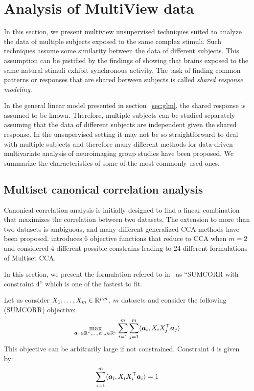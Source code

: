 \section{Analysis of MultiView data}
In this section, we present multiview unsupervised techniques suited to
analyze the data of multiple subjects exposed to the same complex stimuli. Such
techniques assume some similarity between the data of different subjects. This
assumption can be justified by the findings of \cite{hasson2004intersubject} showing that brains exposed to the same natural stimuli exhibit synchronous activity.
The task of finding common patterns or responses that are shared between
subjects is called \emph{shared response modeling}.

In the general linear model presented in
section~\ref{sec:glm}, the shared response is assumed to be known. Therefore,
multiple subjects can be studied separately assuming that the data of different
subjects are independent given the shared response.
In the unsupervised setting it may not be so straightforward to deal with
multiple subjects and therefore many different
methods for data-driven multivariate analysis of neuroimaging group studies
have been proposed.
We summarize the characteristics of some of the most commonly used ones.


\subsection{Multiset canonical correlation analysis}
\label{sec:mcca}
Canonical correlation analysis is initially designed to find a linear
combination that maximizes the correlation between two datasets.
The extension to more than two datasets is ambiguous, and many
different generalized CCA methods have been proposed. \cite{kettenring1971canonical} introduces 6 objective functions that reduce to CCA when $m=2$ and \cite{nielsen2002multiset} considered 4 different possible constrains leading to 24 different formulations of Multiset CCA.

In this section, we present the formulation refered to
in~\cite{nielsen2002multiset} as ``SUMCORR with constraint 4'' which is one of the
fastest to fit.

Let us consider $X_1, \dots, X_m \in \mathbb{R}^{p, n}$, $m$ datasets and consider the following (SUMCORR)
objective:
\begin{align}
  \max_{\boldsymbol{a}_1 \in \mathbb{R}^{v}, \dots, \boldsymbol{a}_m \in \mathbb{R}^{v}} \sum_{i=1}^m \sum_{j=1}^m \langle{ \boldsymbol{a}_i },{ X_i X_j^{\top} \boldsymbol{a}_j }\rangle
\end{align}
This objective can be arbitrarily large if not constrained. Constraint 4 is
given by:
\begin{align}
  \sum_{i=1}^m \langle{ \boldsymbol{a}_i },{ X_i X_i^{\top} \boldsymbol{a}_i }\rangle = 1
\end{align}

